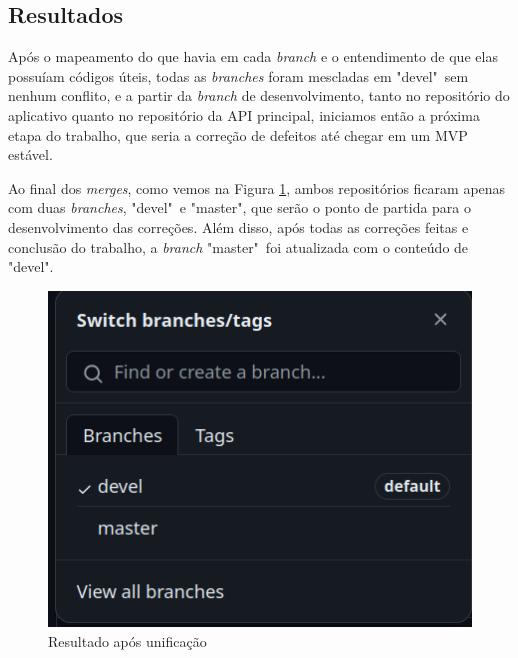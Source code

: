 \subsection{Resultados}

Após o mapeamento do que havia em cada \textit{branch} e o entendimento de que elas possuíam códigos úteis, todas as \textit{branches} foram mescladas em "devel"\ sem nenhum conflito, e a partir da \textit{branch} de desenvolvimento, tanto no repositório do aplicativo quanto no repositório da API principal, iniciamos então a próxima etapa do trabalho, que seria a correção de defeitos até chegar em um MVP estável.

Ao final dos \textit{merges}, como vemos na Figura \ref{branches_after}, ambos repositórios ficaram apenas com duas \textit{branches}, "devel"\  e "master", que serão o ponto de partida para o desenvolvimento das correções. Além disso, após todas as correções feitas e conclusão do trabalho, a \textit{branch} "master"\ foi atualizada com o conteúdo de "devel".

\begin{figure}[h]
	\centering
	\includegraphics[keepaspectratio=true,scale=0.5]{figuras/branches-after.png}
	\caption{Resultado após unificação}
 	\label{branches_after}
\end{figure}